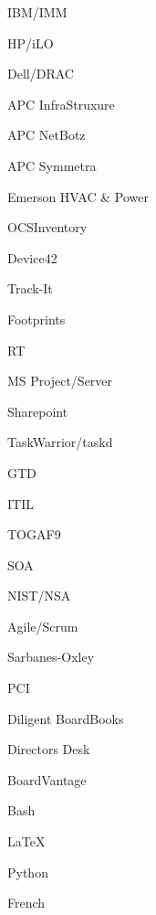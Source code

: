 \documentclass[letterpaper,10pt,final]{memoir}
\begin{document}
{
\begin{multicols}{4}
\begin{compactitem}[\color{Black}$\bullet$]
\item IBM/IMM
\item HP/iLO
\item Dell/DRAC
\item APC InfraStruxure
\item APC NetBotz
\item APC Symmetra
\item Emerson HVAC \& Power
\end{compactitem}
\end{multicols}
\SmallSep

\begin{multicols}{4}
\begin{compactitem}[\color{Black}$\bullet$]
\item OCSInventory
\item Device42
\item Track-It
\item Footprints
\item RT
\item MS Project/Server
\item Sharepoint
\item TaskWarrior/taskd
\end{compactitem}
\end{multicols}
\SmallSep

\begin{multicols}{4}
\begin{compactitem}[\color{Black}$\bullet$]
\item GTD
\item ITIL
\item TOGAF9
\item SOA
\item NIST/NSA
\item Agile/Scrum
\end{compactitem}
\end{multicols}
\SmallSep

\begin{multicols}{4}
\begin{compactitem}[\color{Black}$\bullet$]
\item Sarbanes-Oxley
\item PCI
\item Diligent BoardBooks
\item Directors Desk
\item BoardVantage
\end{compactitem}
\end{multicols}
\SmallSep

\begin{multicols}{4}
\begin{compactitem}[\color{Black}$\bullet$]
\item Bash
\item \LaTeX
\item Python
\item French
\end{compactitem}
\end{multicols}
\Sep
\restoregeometry
}




\end{document}
